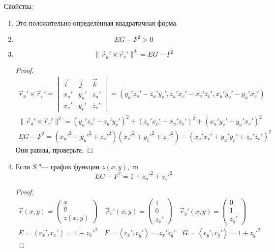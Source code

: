 Свойства:
\begin{enumerate}
\item
	Это положительно определённая квадратичная форма.

\item
	\[ EG - F^2 > 0 \]

\item
	\[ \|\vec r_u' \times \vec r_v' \|^2 = EG - F^2 \]
	\begin{proof}
		\begin{gather*}
			\vec r_u' \times \vec r_v'
		= \begin{vmatrix} \vec i & \vec j & \vec k \\ x_u' & y_u' & z_u' \\ x_v' & y_v' & z_v' \end{vmatrix}
			= (y_u' z_v' - z_u' y_v', z_u' x_v' - x_u' z_v', x_u' y_v' - y_u' x_v') \\
			 \|\vec r_u' \times \vec r_v' \|^2
			= (y_u' z_v' - z_u' y_v')^2 + (z_u' x_v' - x_u' z_v')^2 + (x_u' y_v' - y_u' x_v')^2 \\
			EG - F^2 = (x_u'^2 + y_u'^2 + z_u'^2)(x_v'^2 + y_v'^2 + z_v'^2) - (x_u'x_v' + y_u'y_v' + z_u'z_v')^2
		\end{gather*}
		Они равны, проверьте.
	\end{proof}

\item
	Если $S$ "--- график функции $z(x,y)$, то
	\[ EG - F^2 = 1 + z_u'^2 + z_v'^2 \]
	\begin{proof}
		\begin{gather*}
			\vec r(x, y) = \begin{pmatrix} x \\ y \\ z(x, y) \end{pmatrix} \quad
			\vec r_x'(x, y) = \begin{pmatrix} 1 \\ 0 \\ z_x' \end{pmatrix} \quad
			\vec r_y'(x, y) = \begin{pmatrix} 0 \\ 1 \\ z_y' \end{pmatrix} \\
			E = \left< r_x', r_x' \right> = 1 + z_x'^2 \quad
			F = \left< r_x', r_y' \right> = z_x'z_y' \quad
			G = \left< r_y', r_y' \right> = 1 + z_y'^2
		\end{gather*}
	\end{proof}
\end{enumerate}

